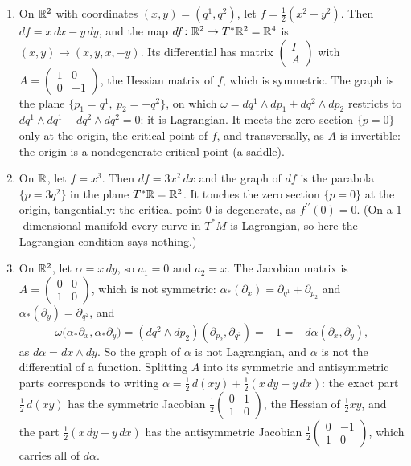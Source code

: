 \begin{example}\label{symplectic-geometry:example-derivative-section}
\begin{enumerate}
\item On $\mathbb{R}^2$ with coordinates $(x, y) = (q^1, q^2)$, let $f = \frac12(x^2 - y^2)$. Then $df = x\,dx - y\,dy$, and the map $df \colon \mathbb{R}^2 \to T^*\mathbb{R}^2 = \mathbb{R}^4$ is
$(x, y) \mapsto (x, y, x, -y)$. Its differential has matrix $\begin{pmatrix} I \\ A \end{pmatrix}$ with $A = \begin{pmatrix} 1 & 0 \\ 0 & -1 \end{pmatrix}$, the Hessian matrix of $f$, which is symmetric.
The graph is the plane $\{p_1 = q^1, \ p_2 = -q^2\}$, on which $\omega = dq^1 \wedge dp_1 + dq^2 \wedge dp_2$ restricts to $dq^1 \wedge dq^1 - dq^2 \wedge dq^2 = 0$: it is Lagrangian. It meets the
zero section $\{p = 0\}$ only at the origin, the critical point of $f$, and transversally, as $A$ is invertible: the origin is a nondegenerate critical point (a saddle).
\item On $\mathbb{R}$, let $f = x^3$. Then $df = 3x^2\,dx$ and the graph of $df$ is the parabola $\{p = 3q^2\}$ in the plane $T^*\mathbb{R} = \mathbb{R}^2$. It touches the zero section $\{p = 0\}$ at the origin, tangentially:
the critical point $0$ is degenerate, as $f^{\prime\prime}(0) = 0$. (On a $1$-dimensional manifold every curve in $T^*M$ is Lagrangian, so here the Lagrangian condition says nothing.)
\item On $\mathbb{R}^2$, let $\alpha = x\,dy$, so $a_1 = 0$ and $a_2 = x$. The Jacobian matrix is $A = \begin{pmatrix} 0 & 0 \\ 1 & 0 \end{pmatrix}$, which is not symmetric:
$\alpha_*(\partial_x) = \partial_{q^1} + \partial_{p_2}$ and $\alpha_*(\partial_y) = \partial_{q^2}$, and
\[
\omega\bigl(\alpha_*\partial_x, \alpha_*\partial_y\bigr) = (dq^2 \wedge dp_2)(\partial_{p_2}, \partial_{q^2}) = -1 = -d\alpha(\partial_x, \partial_y),
\]
as $d\alpha = dx \wedge dy$. So the graph of $\alpha$ is not Lagrangian, and $\alpha$ is not the differential of a function. Splitting $A$ into its symmetric and antisymmetric parts corresponds to writing
$\alpha = \frac12\,d(xy) + \frac12(x\,dy - y\,dx)$: the exact part $\frac12\,d(xy)$ has the symmetric Jacobian $\frac12\begin{pmatrix} 0 & 1 \\ 1 & 0 \end{pmatrix}$, the Hessian of $\frac12xy$, and the
part $\frac12(x\,dy - y\,dx)$ has the antisymmetric Jacobian $\frac12\begin{pmatrix} 0 & -1 \\ 1 & 0 \end{pmatrix}$, which carries all of $d\alpha$.
\end{enumerate}
\end{example}

